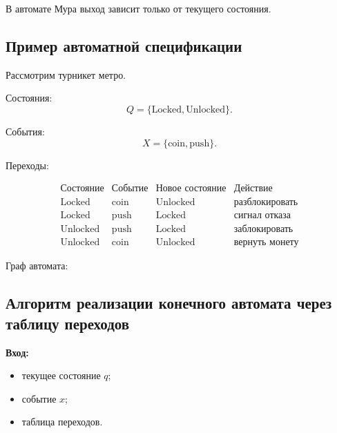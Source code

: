 \documentclass[12pt,a4paper]{article}
\begin{document}
В автомате Мура выход зависит только от текущего состояния.

\subsection{Пример автоматной спецификации}

Рассмотрим турникет метро.

Состояния:
\[
    Q = \{\text{Locked}, \text{Unlocked}\}.
\]

События:
\[
    X = \{\text{coin}, \text{push}\}.
\]

Переходы:

\[
\begin{array}{c|c|c|c}
\text{Состояние} & \text{Событие} & \text{Новое состояние} & \text{Действие} \\
\hline
\text{Locked} & \text{coin} & \text{Unlocked} & \text{разблокировать} \\
\text{Locked} & \text{push} & \text{Locked} & \text{сигнал отказа} \\
\text{Unlocked} & \text{push} & \text{Locked} & \text{заблокировать} \\
\text{Unlocked} & \text{coin} & \text{Unlocked} & \text{вернуть монету}
\end{array}
\]

Граф автомата:

\begin{center}
\end{center}

\subsection{Алгоритм реализации конечного автомата через таблицу переходов}

\textbf{Вход:}
\begin{itemize}
    \item текущее состояние $q$;
    \item событие $x$;
    \item таблица переходов.
\end{itemize}
\end{document}

